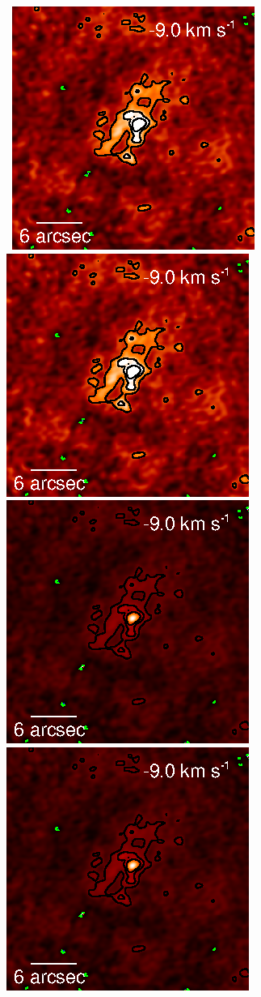 \documentclass[preprint2]{aastex}
\begin{document}
\begin{figure}[hbt!]
\mbox{
          \includegraphics[]{test34.ps}
          \includegraphics[]{test34.ps}
          \includegraphics[]{test_34.ps}
          \includegraphics[]{test_34.ps}
}
\end{figure}
\end{document}
